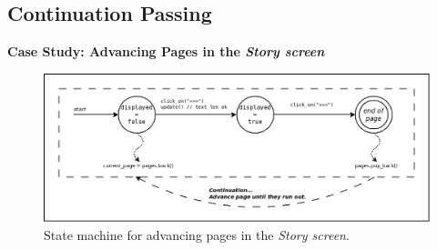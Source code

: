 \documentclass{vgtc}                          %
\begin{document}
\subsection{Continuation Passing}

\textbf{Case Study: Advancing Pages in the \emph{Story screen}}


\begin{figure}[t]
\centering
\includegraphics[width=\columnwidth]{story}
\caption{State machine for advancing pages in the \emph{Story screen}.
\label{fig.story}
}
\end{figure}
\end{document}
